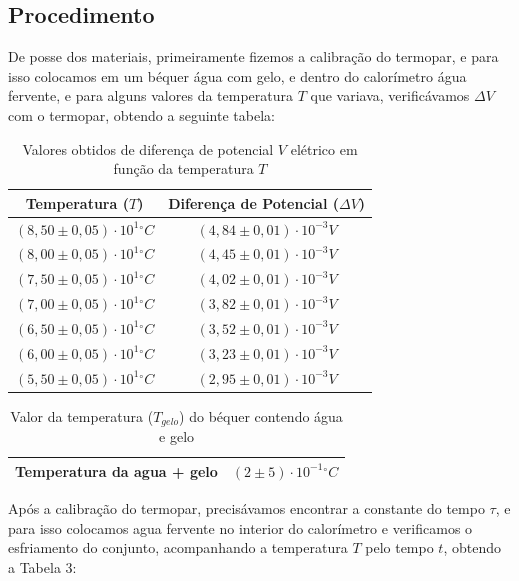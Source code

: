 \documentclass[a4paper]{article}
\providecommand{\tabularnewline}{\\}
\providecommand{\tabularnewline}{\\} %
\begin{document}
	\subsection{Procedimento}
	De posse dos materiais, primeiramente fizemos a calibração do termopar, e para isso colocamos em um béquer água com gelo, e dentro do calorímetro água fervente, e para alguns valores da temperatura $T$ que variava, verificávamos $\Delta V$ com o termopar, obtendo a seguinte tabela:
	
\begin{table}[!ht]
	\caption{Valores obtidos de diferença de potencial $V$ elétrico em função da temperatura $T$}
	\begin{center}\begin{tabular}{|c|c|}
	\hline 
	Temperatura ($T$)  & Diferença de Potencial ($\Delta V$)\tabularnewline
	\hline 
	$(8,50\pm0,05)\cdot10^{1}\unit{^{\circ}C}$  & $(4,84\pm0,01)\cdot10^{-3}\unit{V}$\tabularnewline
	\hline 
	$(8,00\pm0,05)\cdot10^{1}\unit{^{\circ}C}$  & $(4,45\pm0,01)\cdot10^{-3}\unit{V}$\tabularnewline
	\hline 
	$(7,50\pm0,05)\cdot10^{1}\unit{^{\circ}C}$  & $(4,02\pm0,01)\cdot10^{-3}\unit{V}$\tabularnewline
	\hline 
	$(7,00\pm0,05)\cdot10^{1}\unit{^{\circ}C}$  & $(3,82\pm0,01)\cdot10^{-3}\unit{V}$\tabularnewline
	\hline 
	$(6,50\pm0,05)\cdot10^{1}\unit{^{\circ}C}$  & $(3,52\pm0,01)\cdot10^{-3}\unit{V}$\tabularnewline
	\hline 
	$(6,00\pm0,05)\cdot10^{1}\unit{^{\circ}C}$  & $(3,23\pm0,01)\cdot10^{-3}\unit{V}$\tabularnewline
	\hline 
	$(5,50\pm0,05)\cdot10^{1}\unit{^{\circ}C}$  & $(2,95\pm0,01)\cdot10^{-3}\unit{V}$\tabularnewline
	\hline 
\end{tabular}\end{center}
\end{table}

\begin{table}[!ht]
	\caption{Valor da temperatura ($T_{gelo}$) do béquer contendo água e gelo}
	\begin{center}
	\begin{tabular}{|c|c|}
	\hline
	Temperatura da agua + gelo & $(2\pm5)\cdot10^{-1}\unit{^{\circ}C}$\tabularnewline
	\hline 
	\end{tabular}
	\end{center}
\end{table}
	
	Após a calibração do termopar, precisávamos encontrar a constante do tempo $\tau$, e para isso colocamos agua fervente no interior do calorímetro e verificamos o esfriamento do conjunto, acompanhando a temperatura $T$ pelo tempo $t$, obtendo a Tabela 3:
	
\end{document}

